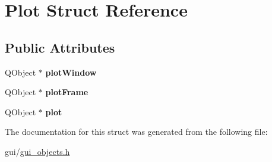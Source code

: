 \hypertarget{struct_plot}{}\section{Plot Struct Reference}
\label{struct_plot}
\subsection*{Public Attributes}
\begin{DoxyCompactItemize}
\item 
\hypertarget{struct_plot_aef96b91eab77fc58e9d337c97bf16d0b}{}\label{struct_plot_aef96b91eab77fc58e9d337c97bf16d0b} 
Q\+Object $\ast$ {\bfseries plot\+Window}
\item 
\hypertarget{struct_plot_a22a2aea9b9cf01dcfeaf43deda9cc6e3}{}\label{struct_plot_a22a2aea9b9cf01dcfeaf43deda9cc6e3} 
Q\+Object $\ast$ {\bfseries plot\+Frame}
\item 
\hypertarget{struct_plot_a9c90096944ddbb2cfeddd9cf17f6d483}{}\label{struct_plot_a9c90096944ddbb2cfeddd9cf17f6d483} 
Q\+Object $\ast$ {\bfseries plot}
\end{DoxyCompactItemize}


The documentation for this struct was generated from the following file\+:\begin{DoxyCompactItemize}
\item 
gui/\hyperlink{gui__objects_8h}{gui\+\_\+objects.\+h}\end{DoxyCompactItemize}
